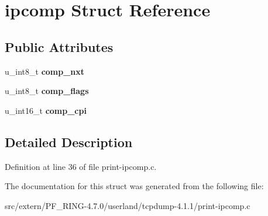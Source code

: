 \hypertarget{structipcomp}{
\section{ipcomp Struct Reference}
\label{structipcomp}
}
\subsection*{Public Attributes}
\begin{DoxyCompactItemize}
\item 
\hypertarget{structipcomp_affccfa5c4d7f603845e3228120a00cff}{
u\_\-int8\_\-t {\bfseries comp\_\-nxt}}
\label{structipcomp_affccfa5c4d7f603845e3228120a00cff}

\item 
\hypertarget{structipcomp_acaf1dd64d529828640430e2f295117fa}{
u\_\-int8\_\-t {\bfseries comp\_\-flags}}
\label{structipcomp_acaf1dd64d529828640430e2f295117fa}

\item 
\hypertarget{structipcomp_a9b9ce79ed73bf39af7f2d0f4bd76880e}{
u\_\-int16\_\-t {\bfseries comp\_\-cpi}}
\label{structipcomp_a9b9ce79ed73bf39af7f2d0f4bd76880e}

\end{DoxyCompactItemize}


\subsection{Detailed Description}


Definition at line 36 of file print-\/ipcomp.c.



The documentation for this struct was generated from the following file:\begin{DoxyCompactItemize}
\item 
src/extern/PF\_\-RING-\/4.7.0/userland/tcpdump-\/4.1.1/print-\/ipcomp.c\end{DoxyCompactItemize}
